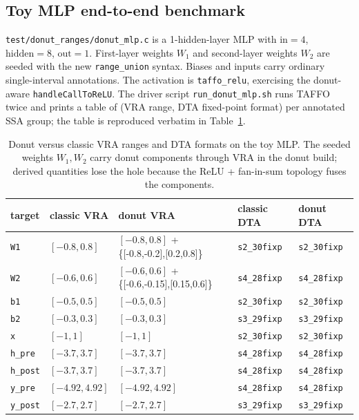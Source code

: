 \documentclass[11pt,a4paper]{article}
\theoremstyle{plain}
\begin{document}
\subsection{Toy MLP end-to-end benchmark}
\label{sec:mlp-benchmark}

\texttt{test/donut\_ranges/donut\_mlp.c} is a 1-hidden-layer MLP
with $\text{in}=4$, $\text{hidden}=8$, $\text{out}=1$. First-layer
weights $W_1$ and second-layer weights $W_2$ are seeded with the new
\texttt{range\_union} syntax. Biases and inputs carry ordinary
single-interval annotations. The activation is
\texttt{taffo\_relu}, exercising the donut-aware
\texttt{handleCallToReLU}. The driver script
\texttt{run\_donut\_mlp.sh} runs TAFFO twice and prints a table of
(VRA range, DTA fixed-point format) per annotated SSA group; the
table is reproduced verbatim in Table~\ref{tab:mlp-benchmark}.

\begin{table}[H]
\centering
\small
\begin{tabular}{@{}lllll@{}}
\toprule
target & classic VRA & donut VRA & classic DTA & donut DTA \\
\midrule
\texttt{W1} & $[-0.8, 0.8]$
  & $[-0.8, 0.8]$ + \{[-0.8,-0.2],[0.2,0.8]\}
  & \texttt{s2\_30fixp} & \texttt{s2\_30fixp} \\
\texttt{W2} & $[-0.6, 0.6]$
  & $[-0.6, 0.6]$ + \{[-0.6,-0.15],[0.15,0.6]\}
  & \texttt{s4\_28fixp} & \texttt{s4\_28fixp} \\
\texttt{b1} & $[-0.5, 0.5]$ & $[-0.5, 0.5]$
  & \texttt{s2\_30fixp} & \texttt{s2\_30fixp} \\
\texttt{b2} & $[-0.3, 0.3]$ & $[-0.3, 0.3]$
  & \texttt{s3\_29fixp} & \texttt{s3\_29fixp} \\
\texttt{x}  & $[-1, 1]$ & $[-1, 1]$
  & \texttt{s2\_30fixp} & \texttt{s2\_30fixp} \\
\texttt{h\_pre}  & $[-3.7, 3.7]$ & $[-3.7, 3.7]$
  & \texttt{s4\_28fixp} & \texttt{s4\_28fixp} \\
\texttt{h\_post} & $[-3.7, 3.7]$ & $[-3.7, 3.7]$
  & \texttt{s4\_28fixp} & \texttt{s4\_28fixp} \\
\texttt{y\_pre}  & $[-4.92, 4.92]$ & $[-4.92, 4.92]$
  & \texttt{s4\_28fixp} & \texttt{s4\_28fixp} \\
\texttt{y\_post} & $[-2.7, 2.7]$ & $[-2.7, 2.7]$
  & \texttt{s3\_29fixp} & \texttt{s3\_29fixp} \\
\bottomrule
\end{tabular}
\caption{Donut versus classic VRA ranges and DTA formats on the toy
MLP. The seeded weights $W_1, W_2$ carry donut components through VRA
in the donut build; derived quantities lose the hole because the
ReLU + fan-in-sum topology fuses the components.}
\label{tab:mlp-benchmark}
\end{table}
\end{document}
